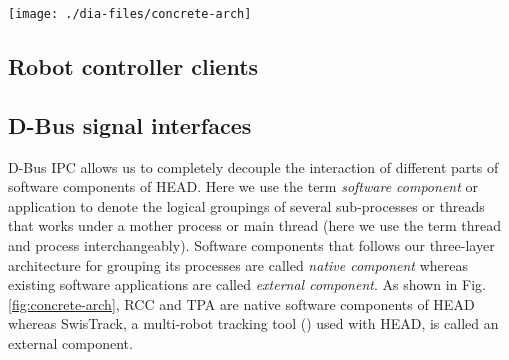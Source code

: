 \begin{figure*}
\begin{center}
\texttt{[image: ./dia-files/concrete-arch]} %
\caption{General outline of {\em HEAD}. A RCC application has been split into two parts: one runs locally in server PC and another runs remotely, e.g., in an embedded PC.} 
\label{fig:concrete-arch}
\end{center}
\end{figure*}
\subsection{Robot controller clients}
\subsection{D-Bus signal interfaces}
D-Bus IPC allows us to completely decouple the interaction of different parts of software components of HEAD. Here we use the term {\em software component} or application to denote the logical groupings of several sub-processes or threads that works under a mother process or main thread (here we use the term thread and process interchangeably). Software components that follows our three-layer architecture for grouping its processes are called {\em native component} whereas existing software applications are called {\em external component}. As shown in Fig. \ref{fig:concrete-arch}, RCC and TPA are native software components of HEAD whereas SwisTrack, a multi-robot tracking tool (\cite{Lochmatter+2008}) used with HEAD, is called an external component.
